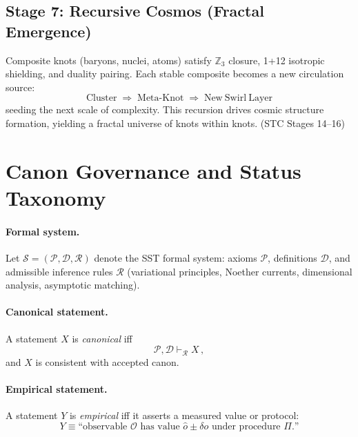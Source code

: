 \documentclass[10pt,reprint,aps,onecolumn,nofootinbib]{revtex4-2}
\begin{document}
\subsection*{Stage 7: Recursive Cosmos (Fractal Emergence)}
Composite knots (baryons, nuclei, atoms) satisfy $\mathbb{Z}_3$ closure,
1+12 isotropic shielding, and duality pairing.
Each stable composite becomes a new circulation source:
\[
\mathrm{Cluster} \;\Rightarrow\;
\mathrm{Meta\text{-}Knot} \;\Rightarrow\;
\mathrm{New\ Swirl\ Layer}
\]
seeding the next scale of complexity.
This recursion drives cosmic structure formation, yielding a fractal universe of knots within knots.
\hfill (STC Stages 14–16)


    \section{Canon Governance and Status Taxonomy}\label{canon58:governance}
        \paragraph{Formal system.}
            Let $\mathcal{S}=(\mathcal{P},\mathcal{D},\mathcal{R})$ denote the SST formal system: axioms $\mathcal{P}$, definitions $\mathcal{D}$, and admissible inference rules $\mathcal{R}$ (variational principles, Noether currents, dimensional analysis, asymptotic matching).
        \paragraph{Canonical statement.}
            A statement $X$ is \emph{canonical} iff
            \[
                \mathcal{P},\mathcal{D}\vdash_{\mathcal{R}} X\,,
            \]
            and $X$ is consistent with accepted canon. %
        \paragraph{Empirical statement.}
            A statement $Y$ is \emph{empirical} iff it asserts a measured value or protocol:
            \[
                Y \equiv \text{``observable $\mathcal{O}$ has value $\hat{o}\pm\delta o$ under procedure $\Pi$.''}
            \]
\end{document}
